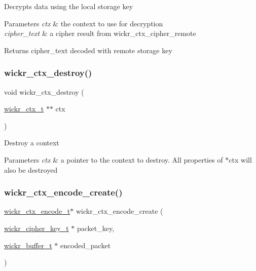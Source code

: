Decrypts data using the local storage key


\begin{DoxyParams}{Parameters}
{\em ctx} & the context to use for decryption \\
\hline
{\em cipher\+\_\+text} & a cipher result from \textquotesingle{}wickr\+\_\+ctx\+\_\+cipher\+\_\+remote\textquotesingle{} \\
\hline
\end{DoxyParams}
\begin{DoxyReturn}{Returns}
\textquotesingle{}cipher\+\_\+text\textquotesingle{} decoded with remote storage key 
\end{DoxyReturn}
\mbox{\label{group__wickr__ctx_gaadfdef183c86992efc33b0d730c90327}} 
\subsubsection{\texorpdfstring{wickr\+\_\+ctx\+\_\+destroy()}{wickr\_ctx\_destroy()}}
{\footnotesize\ttfamily void wickr\+\_\+ctx\+\_\+destroy (\begin{DoxyParamCaption}\item[{\hyperlink{structwickr__ctx}{wickr\+\_\+ctx\+\_\+t} $\ast$$\ast$}]{ctx }\end{DoxyParamCaption})}

Destroy a context


\begin{DoxyParams}{Parameters}
{\em ctx} & a pointer to the context to destroy. All properties of \textquotesingle{}$\ast$ctx\textquotesingle{} will also be destroyed \\
\hline
\end{DoxyParams}
\mbox{\label{group__wickr__ctx_ga810ee459cb0ab1037b5fd1f983d0ded3}} 
\subsubsection{\texorpdfstring{wickr\+\_\+ctx\+\_\+encode\+\_\+create()}{wickr\_ctx\_encode\_create()}}
{\footnotesize\ttfamily \hyperlink{structwickr__ctx__encode}{wickr\+\_\+ctx\+\_\+encode\+\_\+t}$\ast$ wickr\+\_\+ctx\+\_\+encode\+\_\+create (\begin{DoxyParamCaption}\item[{\hyperlink{structwickr__cipher__key}{wickr\+\_\+cipher\+\_\+key\+\_\+t} $\ast$}]{packet\+\_\+key,  }\item[{\hyperlink{structwickr__buffer}{wickr\+\_\+buffer\+\_\+t} $\ast$}]{encoded\+\_\+packet }\end{DoxyParamCaption})}

